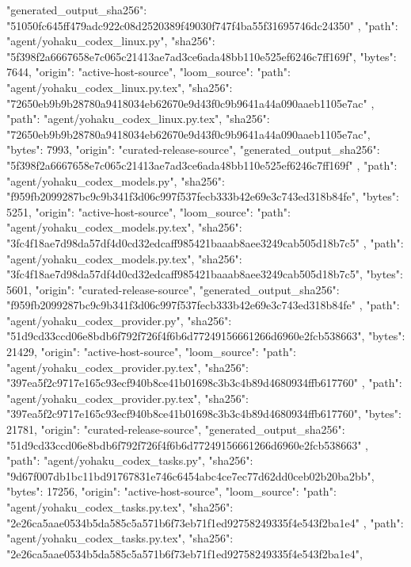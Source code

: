 {{      "generated_output_sha256": "51050fc645ff479adc922c08d2520389f49030f747f4ba55f31695746dc24350"
    },
    {
      "path": "agent/yohaku_codex_linux.py",
      "sha256": "5f398f2a6667658e7c065c21413ae7ad3ce6ada48bb110e525ef6246c7ff169f",
      "bytes": 7644,
      "origin": "active-host-source",
      "loom_source": {
        "path": "agent/yohaku_codex_linux.py.tex",
        "sha256": "72650eb9b9b28780a9418034eb62670e9d43f0c9b9641a44a090aaeb1105e7ac"
      }
    },
    {
      "path": "agent/yohaku_codex_linux.py.tex",
      "sha256": "72650eb9b9b28780a9418034eb62670e9d43f0c9b9641a44a090aaeb1105e7ac",
      "bytes": 7993,
      "origin": "curated-release-source",
      "generated_output_sha256": "5f398f2a6667658e7c065c21413ae7ad3ce6ada48bb110e525ef6246c7ff169f"
    },
    {
      "path": "agent/yohaku_codex_models.py",
      "sha256": "f959fb2099287bc9c9b341f3d06c997f537fecb333b42e69e3c743ed318b84fe",
      "bytes": 5251,
      "origin": "active-host-source",
      "loom_source": {
        "path": "agent/yohaku_codex_models.py.tex",
        "sha256": "3fc4f18ae7d98da57df4d0cd32edcaff985421baaab8aee3249cab505d18b7c5"
      }
    },
    {
      "path": "agent/yohaku_codex_models.py.tex",
      "sha256": "3fc4f18ae7d98da57df4d0cd32edcaff985421baaab8aee3249cab505d18b7c5",
      "bytes": 5601,
      "origin": "curated-release-source",
      "generated_output_sha256": "f959fb2099287bc9c9b341f3d06c997f537fecb333b42e69e3c743ed318b84fe"
    },
    {
      "path": "agent/yohaku_codex_provider.py",
      "sha256": "51d9cd33ccd06e8bdb6f792f726f4f6b6d77249156661266d6960e2fcb538663",
      "bytes": 21429,
      "origin": "active-host-source",
      "loom_source": {
        "path": "agent/yohaku_codex_provider.py.tex",
        "sha256": "397ea5f2c9717e165c93ecf940b8ce41b01698c3b3c4b89d4680934ffb617760"
      }
    },
    {
      "path": "agent/yohaku_codex_provider.py.tex",
      "sha256": "397ea5f2c9717e165c93ecf940b8ce41b01698c3b3c4b89d4680934ffb617760",
      "bytes": 21781,
      "origin": "curated-release-source",
      "generated_output_sha256": "51d9cd33ccd06e8bdb6f792f726f4f6b6d77249156661266d6960e2fcb538663"
    },
    {
      "path": "agent/yohaku_codex_tasks.py",
      "sha256": "9d67f007db1bc11bd91767831e746c6454abc4ce7ec77d62dd0ceb02b20ba2bb",
      "bytes": 17256,
      "origin": "active-host-source",
      "loom_source": {
        "path": "agent/yohaku_codex_tasks.py.tex",
        "sha256": "2e26ca5aae0534b5da585c5a571b6f73eb71f1ed92758249335f4e543f2ba1e4"
      }
    },
    {
      "path": "agent/yohaku_codex_tasks.py.tex",
      "sha256": "2e26ca5aae0534b5da585c5a571b6f73eb71f1ed92758249335f4e543f2ba1e4",
}}
